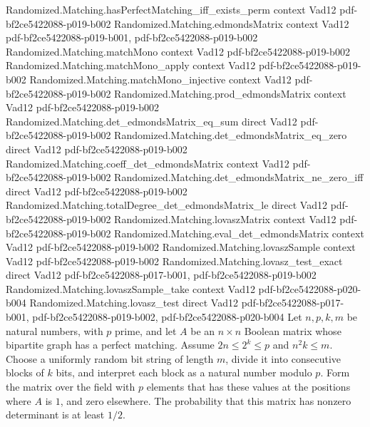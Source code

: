 \begin{theorem}
\proofstep
  {Randomized.Matching.hasPerfectMatching_iff_exists_perm}
  {context}
  {Vad12}
  {pdf-bf2ce5422088-p019-b002}
\proofstep
  {Randomized.Matching.edmondsMatrix}
  {context}
  {Vad12}
  {pdf-bf2ce5422088-p019-b001,
    pdf-bf2ce5422088-p019-b002}
\proofstep
  {Randomized.Matching.matchMono}
  {context}
  {Vad12}
  {pdf-bf2ce5422088-p019-b002}
\proofstep
  {Randomized.Matching.matchMono_apply}
  {context}
  {Vad12}
  {pdf-bf2ce5422088-p019-b002}
\proofstep
  {Randomized.Matching.matchMono_injective}
  {context}
  {Vad12}
  {pdf-bf2ce5422088-p019-b002}
\proofstep
  {Randomized.Matching.prod_edmondsMatrix}
  {context}
  {Vad12}
  {pdf-bf2ce5422088-p019-b002}
\proofstep
  {Randomized.Matching.det_edmondsMatrix_eq_sum}
  {direct}
  {Vad12}
  {pdf-bf2ce5422088-p019-b002}
\proofstep
  {Randomized.Matching.det_edmondsMatrix_eq_zero}
  {direct}
  {Vad12}
  {pdf-bf2ce5422088-p019-b002}
\proofstep
  {Randomized.Matching.coeff_det_edmondsMatrix}
  {context}
  {Vad12}
  {pdf-bf2ce5422088-p019-b002}
\proofstep
  {Randomized.Matching.det_edmondsMatrix_ne_zero_iff}
  {direct}
  {Vad12}
  {pdf-bf2ce5422088-p019-b002}
\proofstep
  {Randomized.Matching.totalDegree_det_edmondsMatrix_le}
  {direct}
  {Vad12}
  {pdf-bf2ce5422088-p019-b002}
\proofstep
  {Randomized.Matching.lovaszMatrix}
  {context}
  {Vad12}
  {pdf-bf2ce5422088-p019-b002}
\proofstep
  {Randomized.Matching.eval_det_edmondsMatrix}
  {context}
  {Vad12}
  {pdf-bf2ce5422088-p019-b002}
\proofstep
  {Randomized.Matching.lovaszSample}
  {context}
  {Vad12}
  {pdf-bf2ce5422088-p019-b002}
\proofstep
  {Randomized.Matching.lovasz_test_exact}
  {direct}
  {Vad12}
  {pdf-bf2ce5422088-p017-b001,
    pdf-bf2ce5422088-p019-b002}
\proofstep
  {Randomized.Matching.lovaszSample_take}
  {context}
  {Vad12}
  {pdf-bf2ce5422088-p020-b004}
\proofstep
  {Randomized.Matching.lovasz_test}
  {direct}
  {Vad12}
  {pdf-bf2ce5422088-p017-b001,
    pdf-bf2ce5422088-p019-b002,
    pdf-bf2ce5422088-p020-b004}
Let $n,p,k,m$ be natural numbers, with $p$ prime, and let $A$ be an $n\times n$ Boolean
matrix whose bipartite graph has a perfect matching. Assume $2n\le 2^k\le p$ and
$n^2k\le m$. Choose a uniformly random bit string of length $m$, divide it into
consecutive blocks of $k$ bits, and interpret each block as a natural number modulo $p$.
Form the matrix over the field with $p$ elements that has these values at the positions
where $A$ is $1$, and zero elsewhere. The probability that this matrix has nonzero
determinant is at least $1/2$.
\end{theorem}

